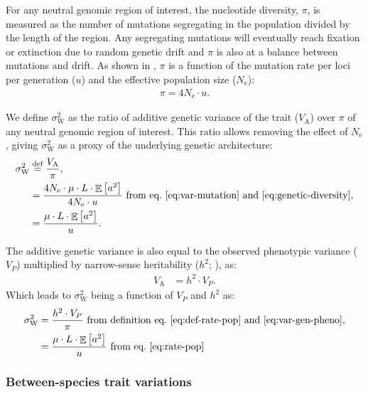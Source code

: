 \documentclass{article}
\newcommand{\defEqual}{\stackrel{\text{def}}{=}}
\newcommand{\Multiply}{\cdot}
\DeclareMathOperator{\E}{\mathbb{E}}
\newcommand{\Ne}{N_{\text{e}}}
\newcommand{\Trait}{P}
\newcommand{\Heritability}{h^2}
\newcommand{\MutationRatePheno}{\mu}
\newcommand{\MutationRateNuc}{u}
\newcommand{\NbrLoci}{L}
\newcommand{\VarPhenotype}{V_{\Trait}}
\newcommand{\VarGenetic}{V_{\mathrm{A}}}
\newcommand{\GenArchi}{\NbrLoci \Multiply \E \left[ a^2 \right]}
\newcommand{\RateWhithin}{\sigma^2_{\mathrm{W}}}
\begin{document}
For any neutral genomic region of interest, the nucleotide diversity, $\pi$, is measured as the number of mutations segregating in the population divided by the length of the region.
Any segregating mutations will eventually reach fixation or extinction due to random genetic drift and $\pi$ is also at a balance between mutations and drift.
As shown in \textcite{tajima_statistical_1989}, $\pi$ is a function of the mutation rate per loci per generation ($\MutationRateNuc$) and the effective population size ($\Ne$):
\begin{gather}
    \pi = 4 \Ne \Multiply \MutationRateNuc \label{eq:genetic-diversity}.
\end{gather}

We define $\RateWhithin$ as the ratio of additive genetic variance of the trait ($\VarGenetic$) over $\pi$ of any neutral genomic region of interest.
This ratio allows removing the effect of $\Ne$, giving $\RateWhithin$ as a proxy of the underlying genetic architecture:
\begin{align}
    \RateWhithin & \defEqual \frac{\VarGenetic }{\pi} \label{eq:def-rate-pop}, \\
    & = \frac{4 \Ne \Multiply \MutationRatePheno \Multiply \GenArchi}{4 \Ne \Multiply \MutationRateNuc} \text{ from eq.~\ref{eq:var-mutation} and~\ref{eq:genetic-diversity}}, \\
    & = \frac{\MutationRatePheno \Multiply \GenArchi}{\MutationRateNuc}. \label{eq:rate-pop}
\end{align}

The additive genetic variance is also equal to the observed phenotypic variance ($\VarPhenotype$) multiplied by narrow-sense heritability ($\Heritability$; \parencite{hill_data_2008}), as:
\begin{align}
    \VarGenetic & = \Heritability \Multiply \VarPhenotype.\label{eq:var-gen-pheno}
\end{align}
Which leads to $\RateWhithin$ being a function of $\VarPhenotype$ and $\Heritability$ as:
\begin{align}
    \RateWhithin & = \frac{\Heritability \Multiply \VarPhenotype }{\pi } \text{ from definition eq.~\ref{eq:def-rate-pop} and~\ref{eq:var-gen-pheno}}, \label{eq:def-rate-pheno-pop} \\
    & = \frac{\MutationRatePheno \Multiply \GenArchi}{\MutationRateNuc} \text{ from eq.~\ref{eq:rate-pop}} \label{eq:rate-pheno-pop}
\end{align}

\subsubsection*{Between-species trait variations}
\end{document}
